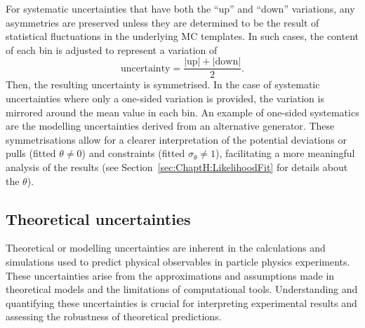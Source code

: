 For systematic uncertainties that have both the ``up'' and ``down'' variations, any asymmetries are 
preserved unless they are determined to be the result of statistical fluctuations in the underlying MC 
templates. In such cases, the content of each bin is adjusted to represent a variation of
\begin{equation*}
	\text{uncertainty} = \frac{|\text{up}| + |\text{down}|}{2}.
\end{equation*}
Then, the resulting uncertainty is symmetrised. %
In the case of systematic uncertainties where only a one-sided variation is provided, 
the variation is mirrored around the mean value in each bin. 
An example of one-sided systematics are the modelling uncertainties derived 
from an alternative generator.
These symmetrisations allow for a clearer interpretation of the potential deviations or pulls
 (fitted $\theta \neq 0$) and constraints (fitted $\sigma{_\theta} \neq 1$), facilitating a 
 more meaningful analysis of the results (see Section~\ref{sec:ChaptH:LikelihoodFit} for details about the $\theta$). 






\subsection{Theoretical uncertainties}
\label{sec:ChaptH:Systematics:Theo}
Theoretical or modelling uncertainties are inherent in the calculations and simulations used to predict 
physical observables in particle physics experiments. These uncertainties arise from the approximations 
and assumptions made in theoretical models and the limitations of computational tools. Understanding 
and quantifying these uncertainties is crucial for interpreting experimental results and assessing the 
robustness of theoretical predictions.

